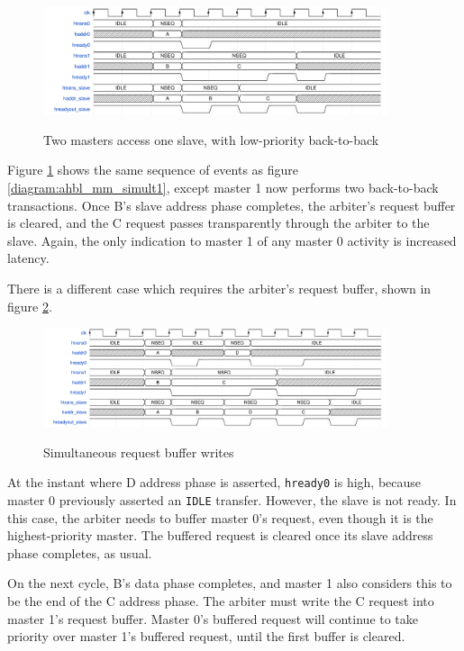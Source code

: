 \documentclass{article}
\begin{document}
\begin{figure}[H]
\centering
\caption{Two masters access one slave, with low-priority back-to-back}
\includegraphics[width=0.9\textwidth]{waves/ahbl_mm_simult2.pdf}
\label{diagram:ahbl_mm_simult2}
\end{figure}

Figure \ref{diagram:ahbl_mm_simult2} shows the same sequence of events as figure \ref{diagram:ahbl_mm_simult1}, except master 1 now performs two back-to-back transactions. Once B's slave address phase completes, the arbiter's request buffer is cleared, and the C request passes transparently through the arbiter to the slave. Again, the only indication to master 1 of any master 0 activity is increased latency.

There is a different case which requires the arbiter's request buffer, shown in figure \ref{diagram:ahbl_mm_simult3}.

\begin{figure}[H]
\centering
\caption{Simultaneous request buffer writes}
\includegraphics[width=0.9\textwidth]{waves/ahbl_mm_simult3.pdf}
\label{diagram:ahbl_mm_simult3}
\end{figure}

At the instant where D address phase is asserted, \texttt{hready0} is high, because master 0 previously asserted an \texttt{IDLE} transfer. However, the slave is not ready. In this case, the arbiter needs to buffer master 0's request, even though it is the highest-priority master. The buffered request is cleared once its slave address phase completes, as usual.

On the next cycle, B's data phase completes, and master 1 also considers this to be the end of the C address phase. The arbiter must write the C request into master 1's request buffer. Master 0's buffered request will continue to take priority over master 1's buffered request, until the first buffer is cleared.
\end{document}
